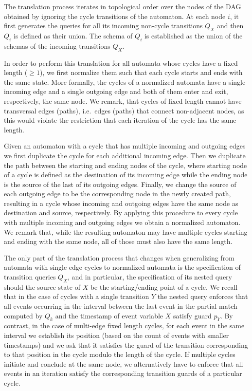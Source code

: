 The translation process iterates in topological order over the nodes of the DAG
obtained by ignoring the cycle transitions of the automaton.
At each node $i$, it first generates the queries for all its incoming
non-cycle transitions $Q_X$ and then $Q_i$ is defined as their union. 
The schema of $Q_i$ is established as the union of the schemas of the incoming 
transitions $Q_X$.


In order to perform this translation for all automata whose cycles have a fixed 
length ($\geq 1$), we first normalize them such that each cycle starts and ends 
with the same state.
More formally, the cycles of a normalized automata have a single incoming edge 
and a single outgoing edge and both of them enter and exit, respectively, the 
same node.
We remark, that cycles of fixed length cannot have transversal edges (paths), 
i.e.\ edges (paths) that connect non-adjacent nodes, as this would violate the 
restriction that each iteration of the cycle has the same length.

Given an automaton with a cycle that has multiple incoming and outgoing edges 
we first duplicate the cycle for each additional incoming edge. 
Then we duplicate the path between the starting and ending nodes of the cycle, 
where starting node of a cycle is defined as the destination of its incoming 
edge while the ending node is the source of the last of its outgoing edges. 
Finally, we change the source of each outgoing edge to be the corresponding 
node in the newly created path, resulting in a cycle whose incoming and 
outgoing edges have the same node as destination and source, respectively.
By applying this procedure to every cycle with multiple incoming and outgoing 
edges we obtain a normalized automaton.  
We remark that, while the resulting automaton may have multiple cycles starting 
and ending with the same node, all of those must also have the same length.


The only part of the translation process that changes when generalizing from 
automata with single edge cycles to normalized automata is the specification of 
transition queries $Q_X$, and in particular, the specification of its nested 
query should the source state of $X$ be the starting/ending point of a cycle.
We recall that in the case of cycles with a single transition $Y$ the nested 
query enforces that all events occurring in the interval between the last event 
in the partial match computed by $Q_k$ and the timestamp of event variable $X$ 
satisfy guard $p_Y$. 
By contrast, in the case of multi-edge fixed length cycles, for each event in 
the same interval we establish its position (based on  the count of events with 
smaller timestamps) and we ask that it satisfies the guard of the transition 
corresponding to that position in the cycle modulo the length of the cycle.
If multiple cycles initiate and conclude at the same node, we alternatively 
have to enforce that all events in an iteration satisfy the corresponding 
transition guards of a particular cycle.


